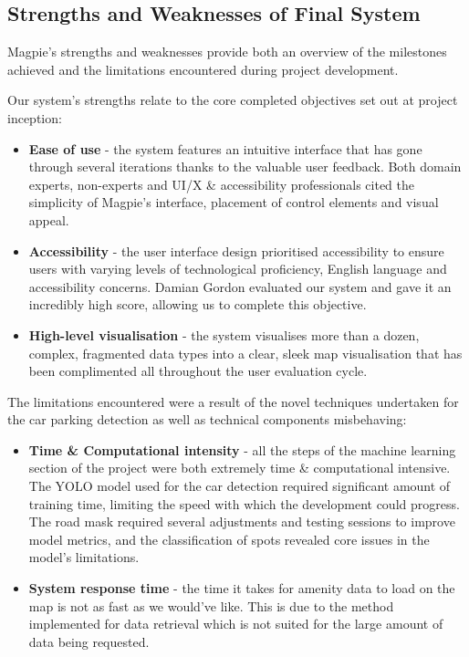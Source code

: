 \subsection{Strengths and Weaknesses of Final System}
Magpie's strengths and weaknesses provide both an overview of the milestones
achieved and the limitations encountered during project development.

Our system's strengths relate to the core completed objectives set out at
project inception:
\begin{itemize}
    \item \textbf{Ease of use} - the system features an intuitive interface that
          has gone through several iterations thanks to the valuable user feedback.
          Both domain experts, non-experts and UI/X \& accessibility professionals
          cited the simplicity of Magpie's interface, placement of control elements
          and visual appeal.
          \vspace{0.2cm}

    \item \textbf{Accessibility} - the user interface design prioritised
          accessibility to ensure users with varying levels of technological
          proficiency, English language and accessibility concerns. Damian Gordon
          evaluated our system and gave it an incredibly high score, allowing us to
          complete this objective.
          \vspace{0.2cm}

    \item \textbf{High-level visualisation} - the system visualises more than a
          dozen, complex, fragmented data types into a clear, sleek map visualisation
          that has been complimented all throughout the user evaluation cycle.
\end{itemize}

The limitations encountered were a result of the novel techniques undertaken for
the car parking detection as well as technical components misbehaving:
\begin{itemize}
    \item \textbf{Time \& Computational intensity} - all the steps of the
          machine learning section of the project were both extremely time \&
          computational intensive. The YOLO model used for the car detection required
          significant amount of training time, limiting the speed with which the
          development could progress. The road mask required several adjustments and
          testing sessions to improve model metrics, and the classification of spots
          revealed core issues in the model's limitations.
          \vspace{0.2cm}

    \item \textbf{System response time} - the time it takes for amenity data to
          load on the map is not as fast as we would've like. This is due to the
          method implemented for data retrieval which is not suited for the large
          amount of data being requested.
\end{itemize}

